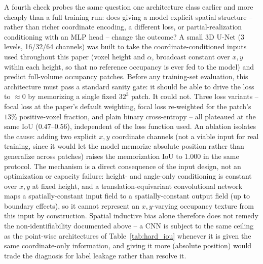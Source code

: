 \documentclass[aip,amsmath,amssymb,reprint]{revtex4-1}
\renewcommand{\ang}{\ensuremath{\alpha}} %
\begin{document}
A fourth check probes the same question one architecture class earlier and
more cheaply than a full training run: does giving a model explicit spatial
structure -- rather than richer coordinate encoding, a different loss, or
partial-realization conditioning with an MLP head -- change the outcome? A
small 3D U-Net (3 levels, 16/32/64 channels) was built to take the
coordinate-conditioned inputs used throughout this paper (voxel height and
$\ang$, broadcast constant over $x,y$ within each height, so that no reference
occupancy is ever fed to the model) and predict full-volume occupancy patches.
Before any training-set evaluation, this architecture must pass a standard
sanity gate: it should be able to drive the loss to $\approx 0$ by memorizing
a single fixed $32^3$ patch. It could not. Three loss variants -- focal loss
at the paper's default weighting, focal loss re-weighted for the patch's
$13\%$ positive-voxel fraction, and plain binary cross-entropy -- all
plateaued at the same IoU ($0.47$--$0.56$), independent of the loss function
used. An ablation isolates the cause: adding two explicit $x,y$ coordinate
channels (not a viable input for real training, since it would let the model
memorize absolute position rather than generalize across patches) raises the
memorization IoU to $1.000$ in the same protocol. The mechanism is a direct
consequence of the input design, not an optimization or capacity failure:
height- and angle-only conditioning is constant over $x,y$ at fixed height, and
a translation-equivariant convolutional network maps a spatially-constant
input field to a spatially-constant output field (up to boundary effects),
so it cannot represent an $x,y$-varying occupancy texture from this input by
construction. Spatial inductive bias alone therefore does not remedy the
non-identifiability documented above -- a CNN is subject to the same ceiling
as the point-wise architectures of Table~\ref{tab:hard_iou} whenever it is
given the same coordinate-only information, and giving it more (absolute
position) would trade the diagnosis for label leakage rather than resolve it.
\end{document}
